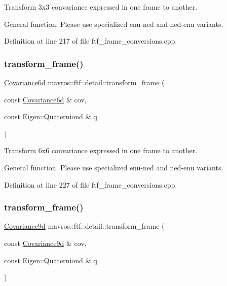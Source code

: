 Transform 3x3 convariance expressed in one frame to another. 

General function. Please use specialized enu-\/ned and ned-\/enu variants. 

Definition at line 217 of file ftf\+\_\+frame\+\_\+conversions.\+cpp.

\mbox{\label{group__nodelib_ga266710bc46b4a6e376a609c4486d39cb}} 
\subsubsection{\texorpdfstring{transform\_frame()}{transform\_frame()}\hspace{0.1cm}{\footnotesize\ttfamily [3/4]}}
{\footnotesize\ttfamily \mbox{\hyperlink{group__nodelib_gadc24a922dd3f6a7ff0d7aed9bda42bca}{Covariance6d}} mavros\+::ftf\+::detail\+::transform\+\_\+frame (\begin{DoxyParamCaption}\item[{const \mbox{\hyperlink{group__nodelib_gadc24a922dd3f6a7ff0d7aed9bda42bca}{Covariance6d}} \&}]{cov,  }\item[{const Eigen\+::\+Quaterniond \&}]{q }\end{DoxyParamCaption})}



Transform 6x6 convariance expressed in one frame to another. 

General function. Please use specialized enu-\/ned and ned-\/enu variants. 

Definition at line 227 of file ftf\+\_\+frame\+\_\+conversions.\+cpp.

\mbox{\label{group__nodelib_ga885808031ecb3f68701172b0e33f37cd}} 
\subsubsection{\texorpdfstring{transform\_frame()}{transform\_frame()}\hspace{0.1cm}{\footnotesize\ttfamily [4/4]}}
{\footnotesize\ttfamily \mbox{\hyperlink{group__nodelib_ga6df3c37d3cd74b3e6919e734575bb9b7}{Covariance9d}} mavros\+::ftf\+::detail\+::transform\+\_\+frame (\begin{DoxyParamCaption}\item[{const \mbox{\hyperlink{group__nodelib_ga6df3c37d3cd74b3e6919e734575bb9b7}{Covariance9d}} \&}]{cov,  }\item[{const Eigen\+::\+Quaterniond \&}]{q }\end{DoxyParamCaption})}



